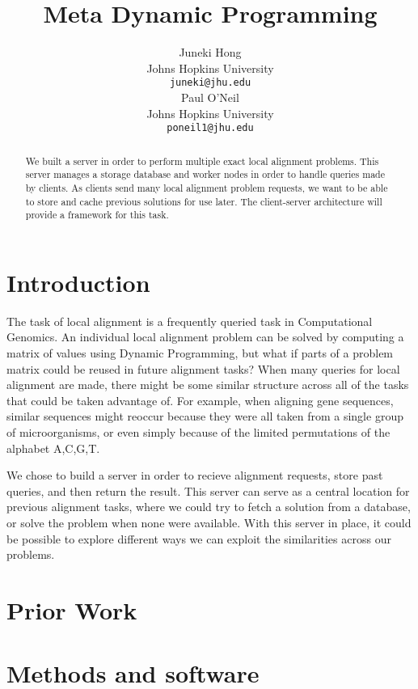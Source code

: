 \documentclass[11pt]{article}
\title{Meta Dynamic Programming}
\author{Juneki Hong \\
  Johns Hopkins University \\
  {\tt juneki@jhu.edu} \\\And
  Paul O'Neil \\
  Johns Hopkins University \\
  {\tt poneil1@jhu.edu} \\}
\date{}
\begin{document}
\maketitle
\begin{abstract}
  We built a server in order to perform multiple exact local alignment problems. This server manages a storage database and worker nodes in order to handle queries made by clients. As clients send many local alignment problem requests, we want to be able to store and cache previous solutions for use later. The client-server architecture will provide a framework for this task. 
\end{abstract}


\section{Introduction}
The task of local alignment is a frequently queried task in Computational Genomics. 
An individual local alignment problem can be solved by computing a matrix of values using Dynamic Programming, but what if parts of a problem matrix could be reused in future alignment tasks?
When many queries for local alignment are made, there might be some similar structure across all of the tasks that could be taken advantage of. For example, when aligning gene sequences, similar sequences might reoccur because they were all taken from a single group of microorganisms, or even simply because of the limited permutations of the alphabet A,C,G,T. 

We chose to build a server in order to recieve alignment requests, store past queries, and then return the result. This server can serve as a central location for previous alignment tasks, where we could try to fetch a solution from a database, or solve the problem when none were available. With this server in place, it could be possible to explore different ways we can exploit the similarities across our problems.
 



\section{Prior Work}


\section{Methods and software}
\end{document}
